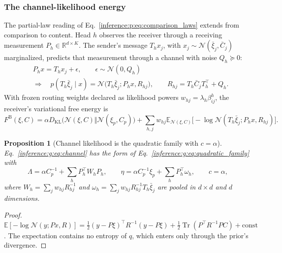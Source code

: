 \documentclass[11pt]{article}
\newtheorem{proposition}[theorem]{Proposition}
\theoremstyle{definition}
\theoremstyle{remark}
\providecommand{\KL}{D_{\mathrm{KL}}}
\providecommand{\Tr}{\operatorname{Tr}}
\providecommand{\E}{\mathbb{E}}
\providecommand{\N}{\mathcal{N}}
\begin{document}
\subsubsection{The channel-likelihood energy}
\label{inference:g:sec:channel}

The partial-law reading of Eq.~\eqref{inference:p:eq:comparison_laws} extends from comparison to content. Head $h$ observes the receiver through a receiving measurement $P_h\in\mathbb R^{d\times K}$. The sender's message $T_hx_j$, with $x_j\sim\N(\bar\xi_j,\bar C_j)$ marginalized, predicts that measurement through a channel with noise $Q_h\succeq0$:
\begin{equation}
\begin{split}
&P_hx=T_hx_j+\epsilon,\qquad \epsilon\sim\N(0,Q_h)\\
&\Longrightarrow\quad
p(T_h\bar\xi_j\mid x)=\N\bigl(T_h\bar\xi_j;P_hx,R_{hj}\bigr),\qquad R_{hj}=T_h\bar C_jT_h^\top+Q_h.
\end{split}
\label{inference:g:eq:channel_model}
\end{equation}
With frozen routing weights declared as likelihood powers $w_{hj}=\lambda_h\beta_{ij}^h$, the receiver's variational free energy is
\begin{equation}
F^{\mathrm B}(\xi,C)=\alpha\KL\bigl(\N(\xi,C)\Vert\N(\xi_p,C_p)\bigr)+\sum_{h,j}w_{hj} \E_{\N(\xi,C)}\bigl[-\log\N(T_h\bar\xi_j;P_hx,R_{hj})\bigr].
\label{inference:g:eq:channel}
\end{equation}

\begin{proposition}[Channel likelihood is the quadratic family with $c=\alpha$]
\label{inference:g:prop:channel}
Eq.~\eqref{inference:g:eq:channel} has the form of Eq.~\eqref{inference:g:eq:quadratic_family} with
\begin{equation}
\Lambda=\alpha C_p^{-1}+\sum_hP_h^\top W_hP_h,\qquad
\eta=\alpha C_p^{-1}\xi_p+\sum_hP_h^\top\omega_h,\qquad
c=\alpha,
\label{inference:g:eq:channel_stats}
\end{equation}
where $W_h=\sum_jw_{hj}R_{hj}^{-1}$ and $\omega_h=\sum_jw_{hj}R_{hj}^{-1}T_h\bar\xi_j$ are pooled in $d\times d$ and $d$ dimensions.
\end{proposition}

\begin{proof}
$\E[-\log\N(y;Px,R)]=\tfrac12(y-P\xi)^\top R^{-1}(y-P\xi)+\tfrac12\Tr(P^\top R^{-1}PC)+\text{const}$. The expectation contains no entropy of $q$, which enters only through the prior's divergence.
\end{proof}
\end{document}

